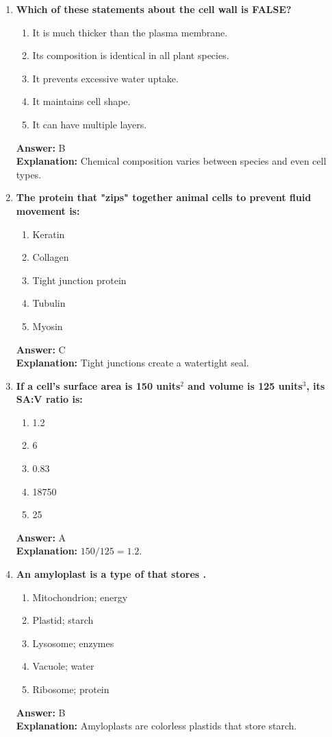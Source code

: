 \documentclass[11pt, a4paper]{article}
\begin{document}
\begin{enumerate}[leftmargin=*, label=\arabic*.]
\item \textbf{Which of these statements about the cell wall is FALSE?}
\begin{enumerate}[label=\Alph*.]
\item It is much thicker than the plasma membrane.
\item Its composition is identical in all plant species.
\item It prevents excessive water uptake.
\item It maintains cell shape.
\item It can have multiple layers.
\end{enumerate}
\textbf{Answer:} B \\
\textbf{Explanation:} Chemical composition varies between species and even cell types.

\item \textbf{The protein that "zips" together animal cells to prevent fluid movement is:}
\begin{enumerate}[label=\Alph*.]
\item Keratin
\item Collagen
\item Tight junction protein
\item Tubulin
\item Myosin
\end{enumerate}
\textbf{Answer:} C \\
\textbf{Explanation:} Tight junctions create a watertight seal.

\item \textbf{If a cell's surface area is 150 units$^2$ and volume is 125 units$^3$, its SA:V ratio is:}
\begin{enumerate}[label=\Alph*.]
\item 1.2
\item 6
\item 0.83
\item 18750
\item 25
\end{enumerate}
\textbf{Answer:} A \\
\textbf{Explanation:} $150 / 125 = 1.2$.

\item \textbf{An amyloplast is a type of \underline{\hspace{1cm}} that stores \underline{\hspace{1cm}}.}
\begin{enumerate}[label=\Alph*.]
\item Mitochondrion; energy
\item Plastid; starch
\item Lysosome; enzymes
\item Vacuole; water
\item Ribosome; protein
\end{enumerate}
\textbf{Answer:} B \\
\textbf{Explanation:} Amyloplasts are colorless plastids that store starch.


\end{enumerate}
\end{document}
